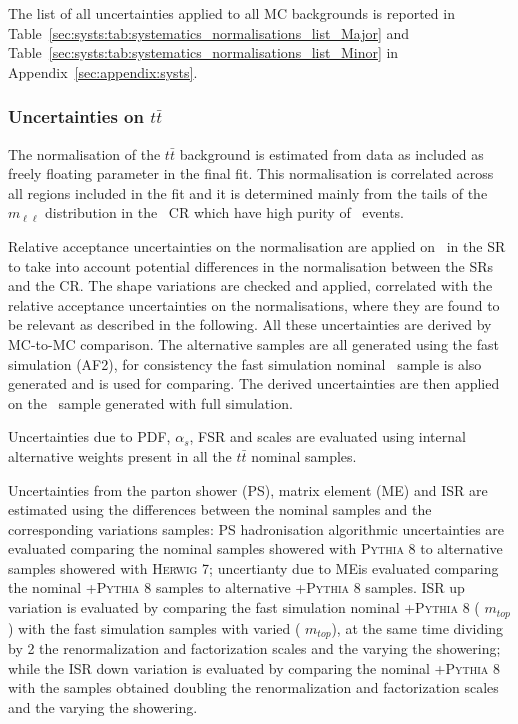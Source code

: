 The list of all uncertainties applied to 
all MC backgrounds is reported in
Table~\ref{sec:systs:tab:systematics_normalisations_list_Major} and 
Table~\ref{sec:systs:tab:systematics_normalisations_list_Minor} 
in Appendix~\ref{sec:appendix:systs}.








\subsubsection{Uncertainties on $t\bar{t}$}
\label{sec:DiHiggs:ttbarsysts}

The normalisation of the $t\bar{t}$ background is estimated 
from data as included as freely floating parameter in the final fit. 
This normalisation is correlated across all regions included 
in the fit and it is determined mainly from the tails of the 
$m_{\ell\ell}$ distribution in the \ZHF\ CR which have 
high purity of \ttbar\ events.

Relative acceptance uncertainties on the normalisation are applied on 
\ttbar\ in the SR
to take into account potential differences in the normalisation 
between the SRs and the CR. 
The shape variations are checked 
and applied, correlated with the relative 
acceptance uncertainties on the normalisations,
where they are found to be relevant as described in the following. 
All these uncertainties are derived by MC-to-MC comparison.
The alternative samples are all generated using the fast simulation (AF2), 
for consistency the fast simulation nominal \ttbar\ sample is also generated
and is used for comparing. The derived uncertainties are then applied on the
\ttbar\ sample generated with full simulation.

Uncertainties due to PDF, $\alpha_s$, FSR and scales 
are evaluated using internal alternative weights 
present in all the $t\bar{t}$ nominal samples. 




Uncertainties from the parton shower (PS), 
matrix element (ME) and ISR are estimated using 
the differences between the nominal samples and 
the corresponding variations samples:
PS hadronisation algorithmic uncertainties 
are evaluated comparing the nominal samples showered with \textsc{Pythia 8} 
to alternative samples showered with \textsc{Herwig 7};
uncertianty due to MEis evaluated comparing 
the nominal \POWHEG+\textsc{Pythia 8} samples to 
alternative \AMCatNLO+\textsc{Pythia 8} samples. 
ISR up variation is evaluated by comparing the 
fast simulation nominal \POWHEG+\textsc{Pythia 8} ( $m_{top}$) with 
the fast simulation samples with varied \hdamp ( $m_{top}$), 
at the same time dividing by 2 the renormalization 
and factorization scales and the varying the showering; 
while the ISR down variation is evaluated by comparing 
the nominal \POWHEG+\textsc{Pythia 8} with the samples obtained 
doubling the renormalization and factorization scales 
and the varying the showering.


